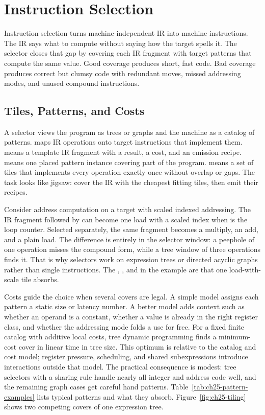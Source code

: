 \chapter{Instruction Selection}\label{ch:instruction-selection}

Instruction selection turns machine-independent IR into machine instructions.
The IR says what to compute without saying how the target spells it.
The selector closes that gap by covering each IR fragment with target patterns that compute the same value.
Good coverage produces short, fast code.
Bad coverage produces correct but clumsy code with redundant moves, missed addressing modes, and unused compound instructions.

\section{Tiles, Patterns, and Costs}\label{sec:ch25-tiles}

A selector views the program as trees or graphs and the machine as a catalog of patterns.
 maps IR operations onto target instructions that implement them.
 means a template IR fragment with a result, a cost, and an emission recipe.
 means one placed pattern instance covering part of the program.
 means a set of tiles that implements every operation exactly once without overlap or gaps.
The task looks like jigsaw: cover the IR with the cheapest fitting tiles, then emit their recipes.

Consider address computation on a target with scaled indexed addressing.
The IR fragment  followed by  can become one load with a scaled index when  is the loop counter.
Selected separately, the same fragment becomes a multiply, an add, and a plain load.
The difference is entirely in the selector window: a peephole of one operation misses the compound form, while a tree window of three operations finds it.
That is why selectors work on expression trees or directed acyclic graphs rather than single instructions.
The , , and  in the example are  that one load-with-scale tile absorbs.

Costs guide the choice when several covers are legal.
A simple model assigns each pattern a static size or latency number.
A better model adds context such as whether an operand is a constant, whether a value is already in the right register class, and whether the addressing mode folds a use for free.
For a fixed finite catalog with additive local costs, tree dynamic programming finds a minimum-cost cover in linear time in tree size.
This optimum is relative to the catalog and cost model; register pressure, scheduling, and shared subexpressions introduce interactions outside that model.
The practical consequence is modest: tree selectors with a sharing rule handle nearly all integer and address code well, and the remaining graph cases get careful hand patterns.
Table~\ref{tab:ch25-pattern-examples} lists typical patterns and what they absorb.
Figure~\ref{fig:ch25-tiling} shows two competing covers of one expression tree.

